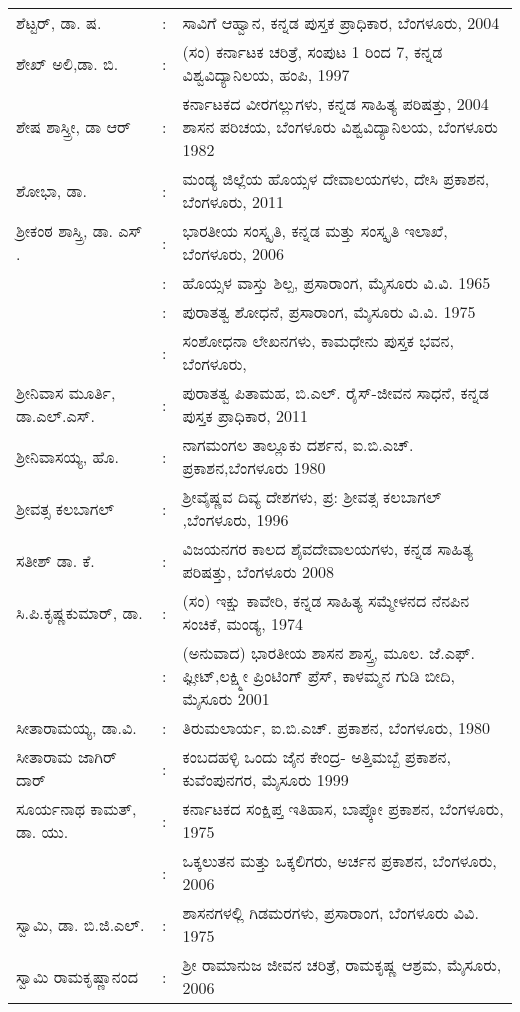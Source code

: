 \begin{longtable}[l]{@{}>{\raggedright}p{4.7cm}cp{9.2cm}<{\raggedright}@{}}
ಶೆಟ್ಟರ್​, ಡಾ. ಷ. & : & ಸಾವಿಗೆ ಆಹ್ವಾನ, ಕನ್ನಡ ಪುಸ್ತಕ ಪ್ರಾಧಿಕಾರ, ಬೆಂಗಳೂರು, 2004\\
ಶೇಖ್​ ಅಲಿ,ಡಾ. ಬಿ. & : & (ಸಂ) ಕರ್ನಾಟಕ ಚರಿತ್ರೆ, ಸಂಪುಟ 1 ರಿಂದ 7, ಕನ್ನಡ ವಿಶ್ವವಿದ್ಯಾನಿಲಯ, ಹಂಪಿ, 1997\\
ಶೇಷ ಶಾಸ್ತ್ರೀ, ಡಾ ಆರ್​ & : & ಕರ್ನಾಟಕದ ವೀರಗಲ್ಲುಗಳು, ಕನ್ನಡ ಸಾಹಿತ್ಯ ಪರಿಷತ್ತು, 2004 ಶಾಸನ ಪರಿಚಯ, ಬೆಂಗಳೂರು ವಿಶ್ವವಿದ್ಯಾನಿಲಯ, ಬೆಂಗಳೂರು 1982\\
ಶೋಭಾ, ಡಾ. & : & ಮಂಡ್ಯ ಜಿಲ್ಲೆಯ ಹೊಯ್ಸಳ ದೇವಾಲಯಗಳು, ದೇಸಿ ಪ್ರಕಾಶನ, ಬೆಂಗಳೂರು, 2011\\
ಶ‍್ರೀಕಂಠ ಶಾಸ್ತ್ರಿ, ಡಾ. ಎಸ್​. & : & ಭಾರತೀಯ ಸಂಸ್ಕೃತಿ, ಕನ್ನಡ ಮತ್ತು ಸಂಸ್ಕೃತಿ ಇಲಾಖೆ, ಬೆಂಗಳೂರು, 2006\\
& : & ಹೊಯ್ಸಳ ವಾಸ್ತು ಶಿಲ್ಪ, ಪ್ರಸಾರಾಂಗ, ಮೈಸೂರು ವಿ.ವಿ. 1965\\
& : & ಪುರಾತತ್ವ ಶೋಧನೆ, ಪ್ರಸಾರಾಂಗ, ಮೈಸೂರು ವಿ.ವಿ. 1975\\
& : & ಸಂಶೋಧನಾ ಲೇಖನಗಳು, ಕಾಮಧೇನು ಪುಸ್ತಕ ಭವನ, ಬೆಂಗಳೂರು,\\
ಶ‍್ರೀನಿವಾಸ ಮೂರ್ತಿ, ಡಾ.ಎಲ್​.ಎಸ್​. & : &  ಪುರಾತತ್ವ ಪಿತಾಮಹ, ಬಿ.ಎಲ್​. ರೈಸ್​-ಜೀವನ ಸಾಧನೆ, ಕನ್ನಡ ಪುಸ್ತಕ ಪ್ರಾಧಿಕಾರ, 2011\\
ಶ‍್ರೀನಿವಾಸಯ್ಯ, ಹೊ.& : & ನಾಗಮಂಗಲ ತಾಲ್ಲೂಕು ದರ್ಶನ, ಐ.ಬಿ.ಎಚ್​. ಪ್ರಕಾಶನ,\newline ಬೆಂಗಳೂರು 1980\\
ಶ‍್ರೀವತ್ಸ ಕಲಬಾಗಲ್​ & : &  ಶ‍್ರೀವೈಷ್ಣವ ದಿವ್ಯ ದೇಶಗಳು, ಪ್ರ: ಶ‍್ರೀವತ್ಸ ಕಲಬಾಗಲ್​,\newline ಬೆಂಗಳೂರು, 1996\\
ಸತೀಶ್​ ಡಾ. ಕೆ. & : & ವಿಜಯನಗರ ಕಾಲದ ಶೈವದೇವಾಲಯಗಳು, ಕನ್ನಡ ಸಾಹಿತ್ಯ ಪರಿಷತ್ತು, ಬೆಂಗಳೂರು 2008\\
ಸಿ.ಪಿ.ಕೃಷ್ಣಕುಮಾರ್​, ಡಾ.& : & (ಸಂ) ಇಕ್ಷು ಕಾವೇರಿ, ಕನ್ನಡ ಸಾಹಿತ್ಯ ಸಮ್ಮೇಳನದ ನೆನಪಿನ ಸಂಚಿಕೆ, ಮಂಡ್ಯ, 1974\\
& : &  (ಅನುವಾದ) ಭಾರತೀಯ ಶಾಸನ ಶಾಸ್ತ್ರ, ಮೂಲ. ಜೆ.ಎಫ್​. ಫ್ಲೀಟ್​,\newline ಲಕ್ಷ್ಮೀ ಪ್ರಿಂಟಿಂಗ್​ ಪ್ರೆಸ್​, ಕಾಳಮ್ಮನ ಗುಡಿ ಬೀದಿ, ಮೈಸೂರು 2001\\
ಸೀತಾರಾಮಯ್ಯ, ಡಾ.ವಿ. & : & ತಿರುಮಲಾರ್ಯ, ಐ.ಬಿ.ಎಚ್​. ಪ್ರಕಾಶನ, ಬೆಂಗಳೂರು, 1980\\
ಸೀತಾರಾಮ ಜಾಗಿರ್​ದಾರ್​ & : & ಕಂಬದಹಳ್ಳಿ ಒಂದು ಜೈನ ಕೇಂದ್ರ- ಅತ್ತಿಮಬ್ಬೆ ಪ್ರಕಾಶನ, ಕುವೆಂಪುನಗರ, ಮೈಸೂರು 1999\\
ಸೂರ್ಯನಾಥ ಕಾಮತ್​, ಡಾ. ಯು. & : & ಕರ್ನಾಟಕದ ಸಂಕ್ಷಿಪ್ತ ಇತಿಹಾಸ, ಬಾಪ್ಕೋ ಪ್ರಕಾಶನ, ಬೆಂಗಳೂರು, 1975\\
& : & ಒಕ್ಕಲುತನ ಮತ್ತು ಒಕ್ಕಲಿಗರು, ಅರ್ಚನ ಪ್ರಕಾಶನ, ಬೆಂಗಳೂರು, 2006\\
ಸ್ವಾಮಿ, ಡಾ. ಬಿ.ಜಿ.ಎಲ್​. & : & ಶಾಸನಗಳಲ್ಲಿ ಗಿಡಮರಗಳು, ಪ್ರಸಾರಾಂಗ, ಬೆಂಗಳೂರು ವಿವಿ. 1975\\
ಸ್ವಾಮಿ ರಾಮಕೃಷ್ಣಾನಂದ & : &  ಶ‍್ರೀ ರಾಮಾನುಜ ಜೀವನ ಚರಿತ್ರೆ, ರಾಮಕೃಷ್ಣ ಆಶ್ರಮ, ಮೈಸೂರು, 2006\\

\end{longtable}
